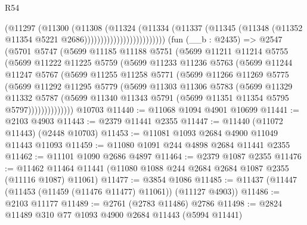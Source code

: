 \begin{lexlean}{R54}
\begin{coremodule}
                                    (@11297
                                      (@11300
                                        (@11308
                                          (@11324
                                            (@11334
                                              (@11337
                                                (@11345
                                                  (@11348
                                                    (@11352
                                                      @11354
                                                      @5221
                                                      @2686)))))))))))))))))))))))))
    (fun (__b : @2435) =>
    @2547
      (@5701
        @5747
        (@5699
          @11185
          @11188
          @5751
          (@5699
            @11211
            @11214
            @5755
            (@5699
              @11222
              @11225
              @5759
              (@5699
                @11233
                @11236
                @5763
                (@5699
                  @11244
                  @11247
                  @5767
                  (@5699
                    @11255
                    @11258
                    @5771
                    (@5699
                      @11266
                      @11269
                      @5775
                      (@5699
                        @11292
                        @11295
                        @5779
                        (@5699
                          @11303
                          @11306
                          @5783
                          (@5699
                            @11329
                            @11332
                            @5787
                            (@5699
                              @11340
                              @11343
                              @5791
                              (@5699 @11351 @11354 @5795 @5797))))))))))))))
    @10703
@11440 := @11068 @1094 @4901 @10699
@11441 := @2103 @4903
@11443 := @2379 @11441 @2355
@11447 := @11440 (@11072 @11443) (@2448 @10703)
@11453 := @11081 @1093 @2684 @4900 @11049 @11443 @11093
@11459 := @11080 @1091 @244 @4898 @2684 @11441 @2355
@11462 := @11101 @1090 @2686 @4897
@11464 := @2379 @1087 @2355
@11476 := @11462 @11464 @11441 (@11080 @1088 @244 @2684 @2684 @1087 @2355 (@11116 @1087) @11061)
@11477 := @3854 @1086
@11485 := @11437 (@11447 (@11453 (@11459 (@11476 @11477) @11061)) (@11127 @4903))
@11486 := @2103 @11177
@11489 := @2761 (@2783 @11486) @2786
@11498 := @2824 @11489 @310 @77 @1093 @4900 @2684 @11443 (@5994 @11441)

\end{coremodule}
\end{lexlean}
